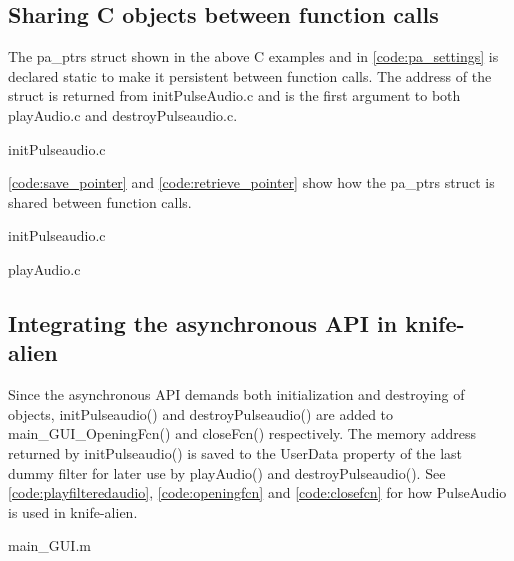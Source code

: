 \documentclass[journal]{IEEEtran}
\begin{document}
\subsection{Sharing C objects between function calls}

The pa\_ptrs struct shown in the above C examples and in \autoref*{code:pa_settings} is declared static to make it persistent between function calls. The address of the struct is returned from initPulseAudio.c and is the first argument to both playAudio.c and destroyPulseaudio.c.


{initPulseaudio.c}

\autoref*{code:save_pointer} and \autoref*{code:retrieve_pointer} show how the pa\_ptrs struct is shared between function calls.


{initPulseaudio.c}


{playAudio.c}

\subsection{Integrating the asynchronous API in knife-alien}
Since the asynchronous API demands both initialization and destroying of objects, initPulseaudio() and destroyPulseaudio() are added to main\_GUI\_OpeningFcn() and closeFcn() respectively. The memory address returned by initPulseaudio() is saved to the UserData property of the last dummy filter for later use by playAudio() and destroyPulseaudio(). See \autoref*{code:playfilteredaudio}, \autoref*{code:openingfcn} and \autoref*{code:closefcn} for how PulseAudio is used in knife-alien.


{main_GUI.m}
\end{document}
